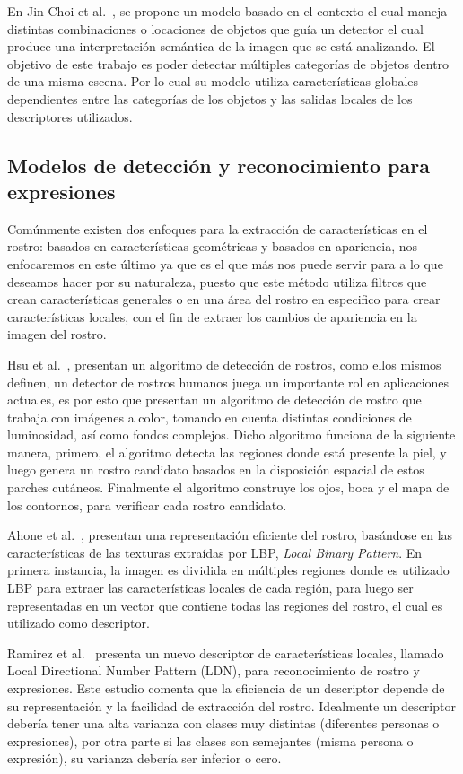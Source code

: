 En Jin Choi et al.~\cite{treebased2012}, se propone un modelo basado en el contexto el cual maneja distintas combinaciones o locaciones de objetos que guía un detector el cual produce una interpretación semántica de la imagen que se está analizando. El objetivo de este trabajo es poder detectar múltiples categorías de objetos dentro de una misma escena. Por lo cual su modelo utiliza características globales dependientes entre las categorías de los objetos y las salidas locales de los descriptores utilizados.

\subsection{Modelos de detección y reconocimiento para expresiones}
Comúnmente existen dos enfoques para la extracción de características en el rostro: basados en características geométricas y basados en apariencia, nos enfocaremos en este último ya que es el que más nos puede servir para a lo que deseamos hacer por su naturaleza, puesto que este método utiliza filtros que crean características generales o en una área del rostro en especifico para crear características locales, con el fin de extraer los cambios de apariencia en la imagen del rostro.

Hsu et al.~\cite{Hsu2002}, presentan un algoritmo de detección de rostros, como ellos mismos definen, un detector de rostros humanos juega un importante rol en aplicaciones actuales, es por esto que presentan un algoritmo de detección de rostro que trabaja con imágenes a color, tomando en cuenta distintas condiciones de luminosidad, así como fondos complejos. Dicho algoritmo funciona de la siguiente manera, primero, el algoritmo detecta las regiones donde está presente la piel, y luego genera un rostro candidato basados en la disposición espacial de estos parches cutáneos. Finalmente el algoritmo construye los ojos, boca y el mapa de los contornos, para verificar cada rostro candidato.

Ahone et al.~\cite{ahonen2006}, presentan una representación eficiente del rostro, basándose en las características de las texturas extraídas por LBP, \textit{Local Binary Pattern}. En primera instancia, la imagen es dividida en múltiples regiones donde es utilizado LBP para extraer las características locales de cada región, para luego ser representadas en un vector que contiene todas las regiones del rostro, el cual es utilizado como descriptor.

Ramirez et al.~\cite{ldnp2013} presenta un nuevo descriptor de características locales, llamado Local Directional Number Pattern (LDN), para reconocimiento de rostro y expresiones. Este estudio comenta que la eficiencia de un descriptor depende de su representación y la facilidad de extracción del rostro. Idealmente un descriptor debería tener una alta varianza con clases muy distintas (diferentes personas o expresiones), por otra parte si las clases son semejantes (misma persona o expresión), su varianza debería ser inferior o cero.

